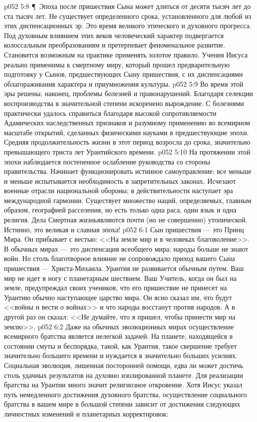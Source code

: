 \vs p052 5:8 \P\ Эпоха после пришествия Сына может длиться от десяти тысяч лет до ста тысяч лет. Не существует определенного срока, установленного для любой из этих диспенсационных эр. Это время великого этического и духовного прогресса. Под духовным влиянием этих веков человеческий характер подвергается колоссальным преобразованиям и претерпевает феноменальное развитие. Становится возможным на практике применять золотое правило. Учения Иисуса реально применимы к смертному миру, который прошел предварительную подготовку у Сынов, предшествующих Сыну пришествия, с их диспенсациями облагораживания характера и приумножения культуры.
\vs p052 5:9 Во время этой эры решены, наконец, проблемы болезней и правонарушений. Благодаря селекции воспроизводства в значительной степени искоренено вырождение. С болезнями практически удалось справиться благодаря высокой сопротивляемости Адамических наследственных признаков и разумному применению во всемирном масштабе открытий, сделанных физическими науками в предшествующие эпохи. Средняя продолжительность жизни в этот период возросла до срока, значительно превышающего триста лет Урантийского времени.
\vs p052 5:10 На протяжении этой эпохи наблюдается постепенное ослабление руководства со стороны правительства. Начинает функционировать истинное самоуправление; все меньше и меньше испытывается необходимость в запретительных законах. Исчезают военные отрасли национальной обороны; в действительности наступает эра международной гармонии. Существует множество наций, определяемых, главным образом, географией расселения, но есть только одна раса, один язык и одна религия. Дела Смертная жизньявляются почти (но не совершенно) утопической. Истинно, это великая и славная эпоха!
\vs p052 6:1 Сын пришествия --- это Принц Мира. Он прибывает с вестью: <<На земле мир и в человеках благоволение>>. В обычных мирах --- это диспенсация всеобщего мира; народы больше не знают войн. Но столь благотворное влияние не сопровождало приход вашего Сына пришествия --- Христа\hyp{}Михаила. Урантия не развивается обычным путем. Ваш мир не идет в ногу с планетарным шествием. Ваш Учитель, когда он был на земле, предупреждал своих учеников, что его пришествие не принесет на Урантию обычно наступающее царство мира. Он ясно сказал им, что будут <<войны и вести о войнах>> и что народы восстанут против народов. А в другой раз он сказал: <<Не думайте, что я пришел, чтобы принести мир на землю>>.
\vs p052 6:2 Даже на обычных эволюционных мирах осуществление всемирного братства является нелегкой задачей. На планете, находящейся в состоянии смуты и беспорядка, такой, как Урантия, такое свершение требует значительно большего времени и нуждается в значительно больших усилиях. Социальная эволюция, лишенная посторонней помощи, едва ли может достичь столь удачных результатов на духовно изолированной планете. Для реализации братства на Урантии много значит религиозное откровение. Хотя Иисус указал путь немедленного достижения духовного братства, осуществление социального братства в вашем мире в большой степени зависит от достижения следующих личностных изменений и планетарных корректировок:
